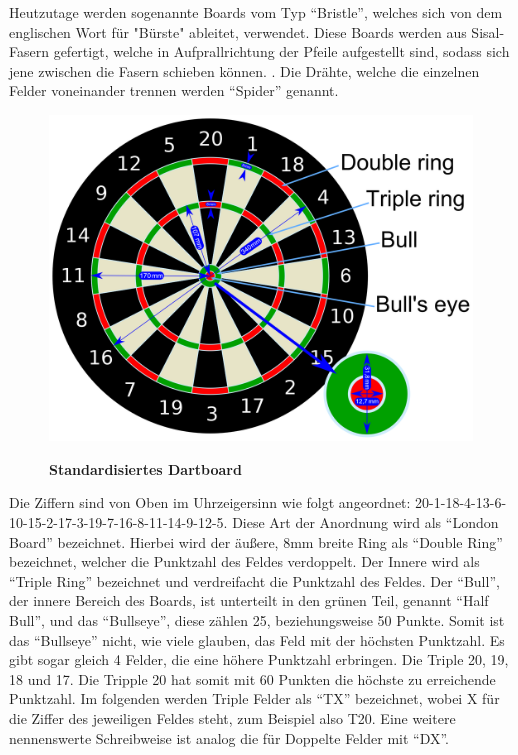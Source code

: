 Heutzutage werden sogenannte Boards vom Typ "`Bristle"', welches sich von dem englischen Wort für "Bürste" ableitet, verwendet. Diese Boards werden aus Sisal-Fasern gefertigt, welche in Aufprallrichtung der Pfeile aufgestellt sind, sodass sich jene zwischen die Fasern schieben können. \autocite[6]{dph2015}. Die Drähte, welche die einzelnen Felder voneinander trennen werden "`Spider"' genannt.
\begin{figure}
\includegraphics[width=\textwidth]{media/Dartboard_Abmessungen}\\
\caption{\textbf{Standardisiertes Dartboard\cite{Board2016}}
}
\label{Fig:dartboard}
\end{figure}

Die Ziffern sind von Oben im Uhrzeigersinn wie folgt angeordnet:  20-1-18-4-13-6-10-15-2-17-3-19-7-16-8-11-14-9-12-5. Diese Art der Anordnung wird als "`London Board"' bezeichnet. Hierbei wird der äußere, 8mm breite Ring als "`Double Ring"' bezeichnet, welcher die Punktzahl des Feldes verdoppelt. Der Innere wird als "`Triple Ring"' bezeichnet und verdreifacht die Punktzahl des Feldes. Der "`Bull"', der innere Bereich des Boards, ist unterteilt in den grünen Teil, genannt "`Half Bull"', und das "`Bullseye"', diese zählen 25, beziehungsweise 50 Punkte. 
Somit ist das "`Bullseye"' nicht, wie viele glauben, das Feld mit der höchsten Punktzahl. Es gibt sogar gleich 4 Felder, die eine höhere Punktzahl erbringen. Die Triple 20, 19, 18 und 17. Die Tripple 20 hat somit mit 60 Punkten die höchste zu erreichende Punktzahl. Im folgenden werden Triple Felder als "`TX"' bezeichnet, wobei X für die Ziffer des jeweiligen Feldes steht, zum Beispiel also T20. Eine weitere nennenswerte Schreibweise ist analog die für Doppelte Felder mit "`DX"'. 

